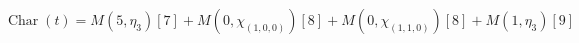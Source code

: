 \[
\operatorname{Char}(t)=M(5,\eta_{3})[7] + M(0,\chi_{(1,0,0)})[8] + M(0,\chi_{(1,1,0)})[8] + M(1,\eta_{3})[9]
\]
